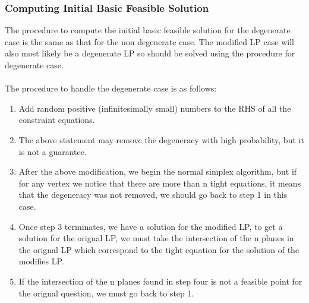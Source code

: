 \documentclass[a4paper,12pt]{report}
\begin{document}
\subsubsection{Computing Initial Basic Feasible Solution}
The procedure to compute the initial basic feasible solution for the degenerate case is the same as that for the non degenerate case. The modified LP case will also most likely be a degenerate LP so should be solved using the procedure for degenerate case.\\\\
The procedure to handle the degenerate case is as follows:
\begin{enumerate}
\item Add random positive (infinitesimally small) numbers to the RHS of all the constraint equations.
\item The above statement may remove the degeneracy with high probability, but it is not a guarantee.
\item After the above modification, we begin the normal simplex algorithm, but if for any vertex we notice that there are more than n tight equations, it means that the degeneracy was not removed, we should go back to step 1 in this case.
\item Once step 3 terminates, we have a solution for the modified LP, to get a solution for the orignal LP, we must take the intersection of the n planes in the orignal LP which correspond to the tight equation for the solution of the modifies LP.
\item If the intersection of the n planes found in step four is not a feasible point for the orignal question, we must go back to step 1.
\end{enumerate}
\end{document}
